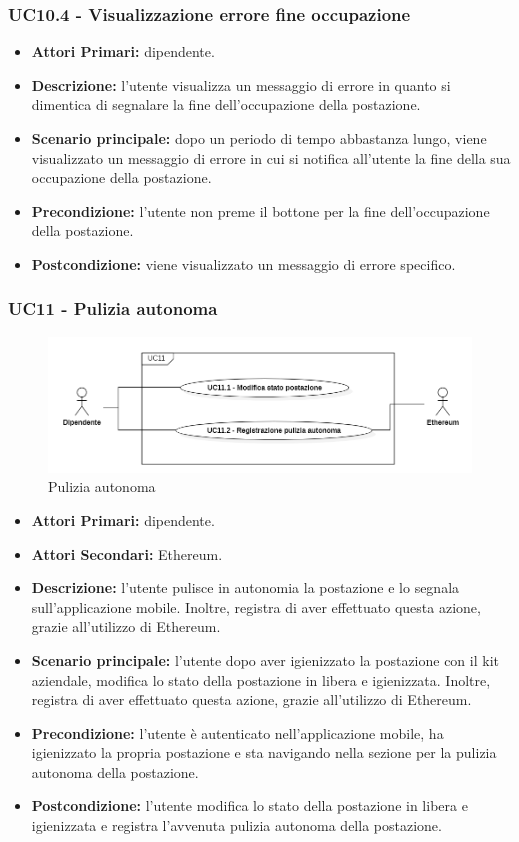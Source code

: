 \subsubsection{ UC10.4 - Visualizzazione errore fine occupazione}
\begin{itemize}
	\item\textbf{Attori Primari:} dipendente.
	\item\textbf{Descrizione:} l’utente visualizza un messaggio di errore in quanto si dimentica di segnalare la fine dell'occupazione della postazione.
	\item\textbf{Scenario principale:} dopo un periodo di tempo abbastanza lungo, viene visualizzato un messaggio di errore in cui si notifica
	all'utente la fine della sua occupazione della postazione.
	\item\textbf{Precondizione:} l’utente non preme il bottone per la fine dell'occupazione della postazione.
	\item\textbf{Postcondizione:} viene visualizzato un messaggio di errore specifico.
\end{itemize}
\subsubsection{ UC11 - Pulizia autonoma}
\begin{figure}[H]
	\centering
	\includegraphics[width=15cm]{res/images/UC11.png}
	\caption{Pulizia autonoma}
	\label{fig:Pulizia autonoma}
\end{figure}
\begin{itemize}
	\item\textbf{Attori Primari:} dipendente.
	\item\textbf{Attori Secondari:} Ethereum.
	\item\textbf{Descrizione:} l’utente pulisce in autonomia la postazione e lo segnala sull'applicazione mobile. Inoltre, 
	registra di aver effettuato questa azione, grazie all'utilizzo di Ethereum.	\item\textbf{Scenario principale:} l’utente dopo aver igienizzato la postazione con il kit aziendale, modifica lo stato della postazione in libera e igienizzata. Inoltre, 
	registra di aver effettuato questa azione, grazie all'utilizzo di Ethereum.
	\item\textbf{Precondizione:} l’utente è autenticato nell'applicazione mobile, ha igienizzato la propria postazione e sta navigando nella sezione per la pulizia 
	autonoma della postazione.
	\item\textbf{Postcondizione:} l’utente modifica lo stato della postazione in libera e igienizzata e registra l'avvenuta pulizia autonoma della postazione.
\end{itemize}
